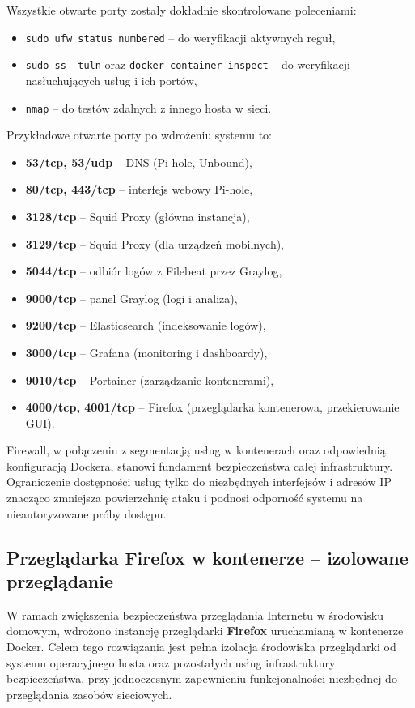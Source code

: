 \documentclass[
    left=2.5cm,         %
    right=2.5cm,        %
    top=2.5cm,          %
    bottom=3cm,         %
    bindingoffset=6mm,  %
    nohyphenation=true %
]{eiti/eiti-thesis} %
\begin{document}
Wszystkie otwarte porty zostały dokładnie skontrolowane poleceniami:
\begin{itemize}
    \item \texttt{sudo ufw status numbered} – do weryfikacji aktywnych reguł,
    \item \texttt{sudo ss -tuln} oraz \texttt{docker container inspect} – do weryfikacji nasłuchujących usług i ich portów,
    \item \texttt{nmap} – do testów zdalnych z innego hosta w sieci.
\end{itemize}

Przykładowe otwarte porty po wdrożeniu systemu to:
\begin{itemize}
    \item \textbf{53/tcp, 53/udp} – DNS (Pi-hole, Unbound),
    \item \textbf{80/tcp, 443/tcp} – interfejs webowy Pi-hole,
    \item \textbf{3128/tcp} – Squid Proxy (główna instancja),
    \item \textbf{3129/tcp} – Squid Proxy (dla urządzeń mobilnych),
    \item \textbf{5044/tcp} – odbiór logów z Filebeat przez Graylog,
    \item \textbf{9000/tcp} – panel Graylog (logi i analiza),
    \item \textbf{9200/tcp} – Elasticsearch (indeksowanie logów),
    \item \textbf{3000/tcp} – Grafana (monitoring i dashboardy),
    \item \textbf{9010/tcp} – Portainer (zarządzanie kontenerami),
    \item \textbf{4000/tcp, 4001/tcp} – Firefox (przeglądarka kontenerowa, przekierowanie GUI).
\end{itemize}

Firewall, w połączeniu z segmentacją usług w kontenerach oraz odpowiednią konfiguracją Dockera, stanowi fundament bezpieczeństwa całej infrastruktury. Ograniczenie dostępności usług tylko do niezbędnych interfejsów i adresów IP znacząco zmniejsza powierzchnię ataku i podnosi odporność systemu na nieautoryzowane próby dostępu.


\subsection{Przeglądarka Firefox w kontenerze – izolowane przeglądanie}

W ramach zwiększenia bezpieczeństwa przeglądania Internetu w środowisku domowym, wdrożono instancję przeglądarki \textbf{Firefox} uruchamianą w kontenerze Docker. Celem tego rozwiązania jest pełna izolacja środowiska przeglądarki od systemu operacyjnego hosta oraz pozostałych usług infrastruktury bezpieczeństwa, przy jednoczesnym zapewnieniu funkcjonalności niezbędnej do przeglądania zasobów sieciowych.
\end{document}
